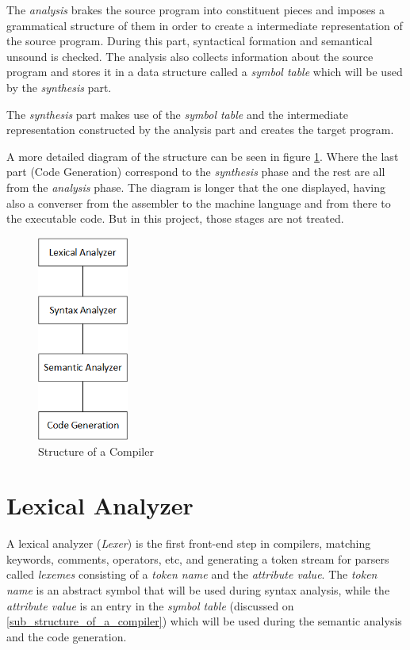 \documentclass[conference]{IEEEtran}
\begin{document}
The \textit{analysis} brakes the source program into constituent pieces and imposes a grammatical structure of them in order to create a intermediate representation of the source program. During this part, syntactical formation and semantical unsound is checked. The analysis also collects information about the source program and stores it in a data structure called a \textit{symbol table} which will be used by the \textit{synthesis} part.

The \textit{synthesis} part makes use of the \textit{symbol table} and the intermediate representation constructed by the analysis part and creates the target program.

A more detailed diagram of the structure can be seen in figure \ref{fig_struct_of_compilator}. Where the last part (Code Generation) correspond to the \textit{synthesis} phase and the rest are all from the \textit{analysis} phase. The diagram is longer that the one displayed, having also a converser from the assembler to the machine language and from there to the executable code. But in this project, those stages are not treated.

\begin{figure}[H]
\centering
\includegraphics[width=3cm]{images/Diagram.png}
\caption{Structure of a Compiler}
\label{fig_struct_of_compilator}
\end{figure}

\section{Lexical Analyzer}
A lexical analyzer (\textit{Lexer}) is the first front-end step in compilers, matching keywords, comments, operators, etc, and generating a token stream for parsers called \textit{lexemes} consisting of a \textit{token name} and the \textit{attribute value}. 
The \textit{token name} is an abstract symbol that will be used during syntax analysis, while the \textit{attribute value} is an entry in the \textit{symbol table} (discussed on \ref{sub_structure_of_a_compiler}) which will be used during the semantic analysis and the code generation.
\end{document}
